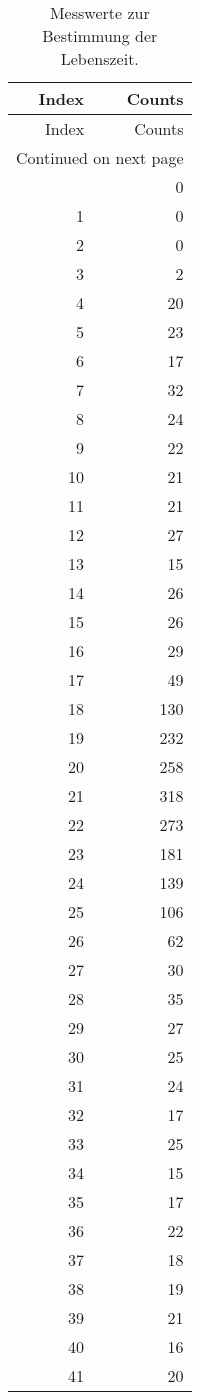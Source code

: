 \begin{longtable}{rr}
\caption{Messwerte zur Bestimmung der Lebenszeit.}\\
\toprule
Index & Counts \\
\midrule
\endfirsthead
\toprule
Index & Counts \\
\midrule
\endhead
\midrule
\multicolumn{2}{r}{Continued on next page} \\
\midrule
\endfoot
\bottomrule
\endlastfoot
0 & 0 \\
1 & 0 \\
2 & 0 \\
3 & 2 \\
4 & 20 \\
5 & 23 \\
6 & 17 \\
7 & 32 \\
8 & 24 \\
9 & 22 \\
10 & 21 \\
11 & 21 \\
12 & 27 \\
13 & 15 \\
14 & 26 \\
15 & 26 \\
16 & 29 \\
17 & 49 \\
18 & 130 \\
19 & 232 \\
20 & 258 \\
21 & 318 \\
22 & 273 \\
23 & 181 \\
24 & 139 \\
25 & 106 \\
26 & 62 \\
27 & 30 \\
28 & 35 \\
29 & 27 \\
30 & 25 \\
31 & 24 \\
32 & 17 \\
33 & 25 \\
34 & 15 \\
35 & 17 \\
36 & 22 \\
37 & 18 \\
38 & 19 \\
39 & 21 \\
40 & 16 \\
41 & 20 \\

\end{longtable}
